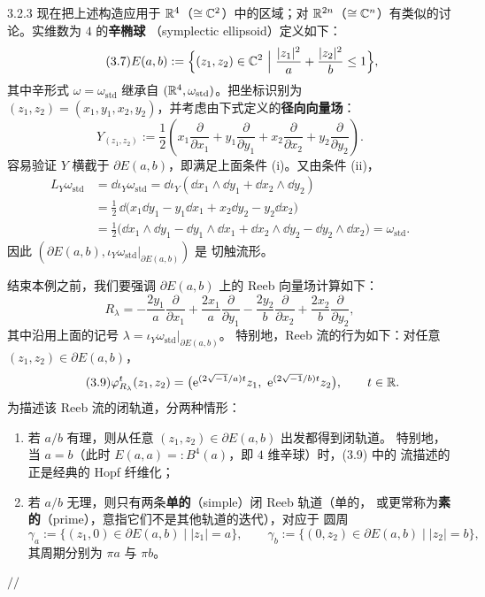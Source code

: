 \begin{wexam}{3.2.3}
现在把上述构造应用于 $\mathbb{R}^4$（$\cong\mathbb{C}^2$）中的区域；对
$\mathbb{R}^{2n}$（$\cong\mathbb{C}^n$）有类似的讨论。实维数为 $4$ 的\textbf{辛椭球}
（symplectic ellipsoid）定义如下：
\begin{equation}\tag{3.7}
  E(a,b):=\Bigl\{(z_1,z_2)\in\mathbb{C}^2
  \ \Big|\ \frac{|z_1|^2}{a}+\frac{|z_2|^2}{b}\le1\Bigr\},
\end{equation}
其中辛形式 $\omega=\omega_{\mathrm{std}}$ 继承自
$(\mathbb{R}^4,\omega_{\mathrm{std}})$。把坐标识别为
$(z_1,z_2)=(x_1,y_1,x_2,y_2)$，并考虑由下式定义的\textbf{径向向量场}：
\begin{equation}\tag{3.8}
  Y_{(z_1,z_2)}:=\frac12\left(x_1\frac{\partial}{\partial x_1}
  +y_1\frac{\partial}{\partial y_1}+x_2\frac{\partial}{\partial x_2}
  +y_2\frac{\partial}{\partial y_2}\right).
\end{equation}
容易验证 $Y$ 横截于 $\partial E(a,b)$，即满足上面条件 (i)。又由条件 (ii)，
\begin{align*}
  L_Y\omega_{\mathrm{std}}
  &=\dd\iota_Y\omega_{\mathrm{std}}
   =\dd\iota_Y(\dd x_1\wedge\dd y_1+\dd x_2\wedge\dd y_2)\\
  &=\frac12\,\dd\bigl(x_1\dd y_1-y_1\dd x_1+x_2\dd y_2-y_2\dd x_2\bigr)\\
  &=\frac12\bigl(\dd x_1\wedge\dd y_1-\dd y_1\wedge\dd x_1
   +\dd x_2\wedge\dd y_2-\dd y_2\wedge\dd x_2\bigr)
   =\omega_{\mathrm{std}}.
\end{align*}
因此 $(\partial E(a,b),\iota_Y\omega_{\mathrm{std}}|_{\partial E(a,b)})$ 是
切触流形。

结束本例之前，我们要强调 $\partial E(a,b)$ 上的 Reeb 向量场计算如下：
\[
  R_\lambda=-\frac{2y_1}{a}\frac{\partial}{\partial x_1}
  +\frac{2x_1}{a}\frac{\partial}{\partial y_1}
  -\frac{2y_2}{b}\frac{\partial}{\partial x_2}
  +\frac{2x_2}{b}\frac{\partial}{\partial y_2},
\]
其中沿用上面的记号 $\lambda=\iota_Y\omega_{\mathrm{std}}|_{\partial E(a,b)}$。
特别地，Reeb 流的行为如下：对任意 $(z_1,z_2)\in\partial E(a,b)$，
\begin{equation}\tag{3.9}
  \varphi^t_{R_\lambda}(z_1,z_2)
  =\bigl(\mathrm{e}^{(2\sqrt{-1}/a)t}z_1,\ \mathrm{e}^{(2\sqrt{-1}/b)t}z_2\bigr),
  \qquad t\in\mathbb{R} .
\end{equation}
为描述该 Reeb 流的闭轨道，分两种情形：
\begin{enumerate}[label=(\roman*)]
  \item 若 $a/b$ 有理，则从任意 $(z_1,z_2)\in\partial E(a,b)$ 出发都得到闭轨道。
        特别地，当 $a=b$（此时 $E(a,a)=:B^4(a)$，即 $4$ 维辛球）时，(3.9) 中的
        流描述的正是经典的 Hopf 纤维化；
  \item 若 $a/b$ 无理，则只有两条\textbf{单的}（simple）闭 Reeb 轨道（单的，
        或更常称为\textbf{素的}（prime），意指它们不是其他轨道的迭代），对应于
        圆周
        \[
          \gamma_a:=\{(z_1,0)\in\partial E(a,b)\mid |z_1|=a\},\qquad
          \gamma_b:=\{(0,z_2)\in\partial E(a,b)\mid |z_2|=b\},
        \]
        其周期分别为 $\pi a$ 与 $\pi b$。
\end{enumerate}

  \hfill$//$
\end{wexam}

